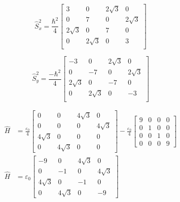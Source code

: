 \documentclass{article}
\begin{document}
\begin{enumerate}
		\begin{minipage}{0.45\textwidth}
			\begin{equation}
				\hat{S}^2_x = \frac{\hbar^2}{4}
				\begin{bmatrix}
					3 & 0 & 2\sqrt{3} & 0 \\
					0 & 7 & 0 & 2\sqrt{3} \\
					2\sqrt{3} & 0 & 7 & 0 \\
					0 & 2\sqrt{3} & 0 & 3 \\
				\end{bmatrix}
			\end{equation}
		\end{minipage}
		\begin{minipage}{0.45\textwidth}
			\begin{equation}
				\hat{S}^2_y = \frac{-\hbar^2}{4}
				\begin{bmatrix}
					-3 & 0 & 2\sqrt{3} & 0 \\
					0 & -7 & 0 & 2\sqrt{3} \\
					2\sqrt{3} & 0 & -7 & 0 \\
					0 & 2\sqrt{3} & 0 & -3 \\
				\end{bmatrix}
			\end{equation}
		\end{minipage}
		\begin{align}
			\hat{H} &= \frac{\varepsilon_0}{4}
			\begin{bmatrix}
				0 & 0 & 4\sqrt{3} & 0 \\
				0 & 0 & 0 & 4\sqrt{3} \\
				4\sqrt{3} & 0 & 0 & 0 \\
				0 & 4\sqrt{3} & 0 & 0
			\end{bmatrix} - \frac{\varepsilon_0}{4}
			\begin{bmatrix}
				9 & 0 & 0 & 0 \\
				0 & 1 & 0 & 0 \\
				0 & 0 &	1 & 0 \\
				0 & 0 & 0 & 9
			\end{bmatrix} \\
			\hat{H} &= \varepsilon_0
			\begin{bmatrix}
				-9 & 0 & 4\sqrt{3} & 0 \\
				0 & -1 & 0 & 4\sqrt{3} \\
				4\sqrt{3} & 0 & -1 & 0 \\
				0 & 4\sqrt{3} & 0 & -9
			\end{bmatrix} 	
		\end{align}
		\endgroup
\clearpage
	

\end{enumerate}
\end{document}
